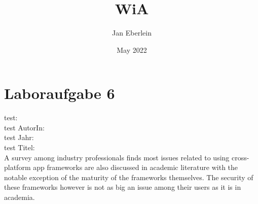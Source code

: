 \documentclass{article}
\title{WiA}
\author{Jan Eberlein}
\date{May 2022}
\begin{document}
\maketitle

\section{Laboraufgabe 6}
test: \cite[][Seite 2]{biorn-hansenEmpiricalInvestigationPerformance2020}
\\
test AutorIn: \citeauthor{biorn-hansenEmpiricalInvestigationPerformance2020}
\\
test Jahr: \citeyear{biorn-hansenEmpiricalInvestigationPerformance2020}
\\
test Titel: 
\\

A survey among industry professionals finds most issues related to using cross-platform app frameworks are also discussed in academic literature with the notable exception of the maturity of the frameworks themselves. \cite{biorn-hansenEmpiricalStudyCrossPlatform2019}
The security of these frameworks however is not as big an issue among their users as it is in academia. 

\printbibliography
\end{document}
